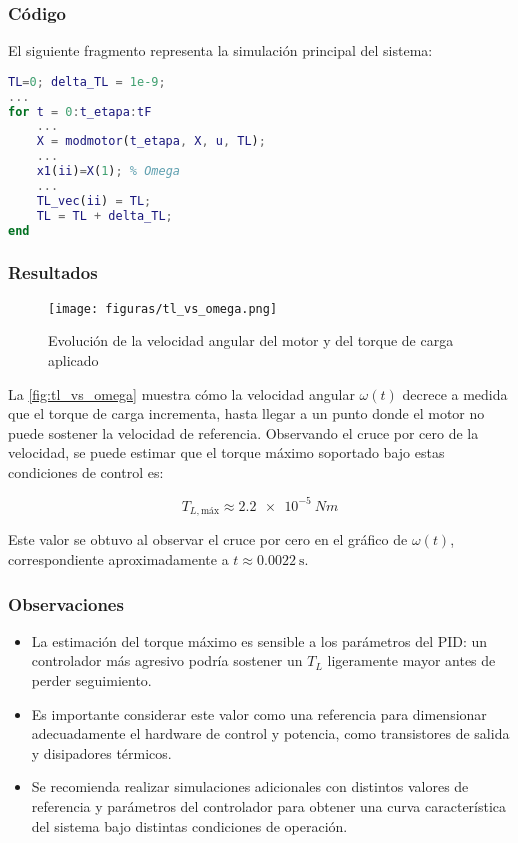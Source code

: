 \documentclass{article}
\begin{document}
\subsubsection*{Código}
El siguiente fragmento representa la simulación principal del sistema:

\begin{lstlisting}[language=Matlab, caption={Simulación para identificación de $T_L$ máximo}]
% Fragmento clave:
TL=0; delta_TL = 1e-9;
...
for t = 0:t_etapa:tF
    ...
    X = modmotor(t_etapa, X, u, TL);
    ...
    x1(ii)=X(1); % Omega
    ...
    TL_vec(ii) = TL;
    TL = TL + delta_TL;
end
\end{lstlisting}

\subsubsection*{Resultados}

\begin{figure}[H]
    \centering
    \texttt{[image: figuras/tl\_vs\_omega.png]}
    \caption{Evolución de la velocidad angular del motor y del torque de carga aplicado}
    \label{fig:tl_vs_omega}
\end{figure}

La \autoref{fig:tl_vs_omega} muestra cómo la velocidad angular $\omega(t)$ decrece a medida que el torque de carga incrementa, hasta llegar a un punto donde el motor no puede sostener la velocidad de referencia. Observando el cruce por cero de la velocidad, se puede estimar que el torque máximo soportado bajo estas condiciones de control es:

\[
T_{L, \text{máx}} \approx \SI{2.2e-5}{Nm}
\]

Este valor se obtuvo al observar el cruce por cero en el gráfico de $\omega(t)$, correspondiente aproximadamente a $t \approx \SI{0.0022}{\second}$.

\subsubsection*{Observaciones}
\begin{itemize}
    \item La estimación del torque máximo es sensible a los parámetros del PID: un controlador más agresivo podría sostener un $T_L$ ligeramente mayor antes de perder seguimiento.
    \item Es importante considerar este valor como una referencia para dimensionar adecuadamente el hardware de control y potencia, como transistores de salida y disipadores térmicos.
    \item Se recomienda realizar simulaciones adicionales con distintos valores de referencia y parámetros del controlador para obtener una curva característica del sistema bajo distintas condiciones de operación.
\end{itemize}
\end{document}
